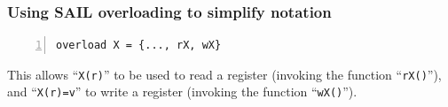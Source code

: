 \documentclass[aspectratio=169]{beamer}
\newcommand{\slidefont}{\scriptsize}
\newcommand{\cf}{\scriptsize\tt}
\begin{document}

\begin{frame}[fragile]
  \frametitle{Using SAIL overloading to simplify notation}

  \slidefont

  \begin{Verbatim}[frame=single, numbers=left, label = File riscv\_regs.sail]
overload X = {..., rX, wX}
  \end{Verbatim}

  \begin{minipage}{\textwidth}
    This allows ``{\cf X(r)}'' to be used to read a register (invoking the function ``{\cf rX()}''), \\
    and ``{\cf X(r)=v}'' to write a register (invoking the function ``{\cf wX()}'').
  \end{minipage}

\end{frame}



\end{document}
